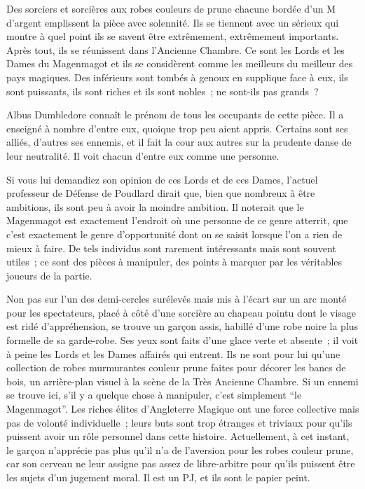 Des sorciers et sorcières aux robes couleurs de prune chacune bordée d'un M d'argent emplissent la pièce avec solennité. Ils se tiennent avec un sérieux qui montre à quel point ils se savent être extrêmement, extrêmement importants. Après tout, ils se réunissent dans l'Ancienne Chambre. Ce sont les Lords et les Dames du Magenmagot et ils se considèrent comme les meilleurs du meilleur des pays magiques. Des inférieurs sont tombés à genoux en supplique face à eux, ils sont puissants, ils sont riches et ils sont nobles~; ne sont-ils pas grands~?

Albus Dumbledore connaît le prénom de tous les occupants de cette pièce. Il a enseigné à nombre d'entre eux, quoique trop peu aient appris. Certains sont ses alliés, d'autres ses ennemis, et il fait la cour aux autres sur la prudente danse de leur neutralité. Il voit chacun d'entre eux comme une personne.

Si vous lui demandiez son opinion de ces Lords et de ces Dames, l'actuel professeur de Défense de Poudlard dirait que, bien que nombreux à être ambitions, ils sont peu à avoir la moindre ambition. Il noterait que le Magenmagot est exactement l'endroit où une personne de ce genre atterrit, que c'est exactement le genre d'opportunité dont on se saisit lorsque l'on a rien de mieux à faire. De tels individus sont rarement intéressants mais sont souvent utiles~; ce sont des pièces à manipuler, des points à marquer par les véritables joueurs de la partie.

Non pas sur l'un des demi-cercles surélevés mais mis à l'écart sur un arc monté pour les spectateurs, placé à côté d'une sorcière au chapeau pointu dont le visage est ridé d'appréhension, se trouve un garçon assis, habillé d'une robe noire la plus formelle de sa garde-robe. Ses yeux sont faits d'une glace verte et absente~; il voit à peine les Lords et les Dames affairés qui entrent. Ils ne sont pour lui qu'une collection de robes murmurantes couleur prune faites pour décorer les bancs de bois, un arrière-plan visuel à la scène de la Très Ancienne Chambre. Si un ennemi se trouve ici, s'il y a quelque chose à manipuler, c'est simplement “le Magenmagot”. Les riches élites d'Angleterre Magique ont une force collective mais pas de volonté individuelle~; leurs buts sont trop étranges et triviaux pour qu'ils puissent avoir un rôle personnel dans cette histoire. Actuellement, à cet instant, le garçon n'apprécie pas plus qu'il n'a de l'aversion pour les robes couleur prune, car son cerveau ne leur assigne pas assez de libre-arbitre pour qu'ils puissent être les sujets d'un jugement moral. Il est un PJ\footnotemark{}, et ils sont le papier peint.

